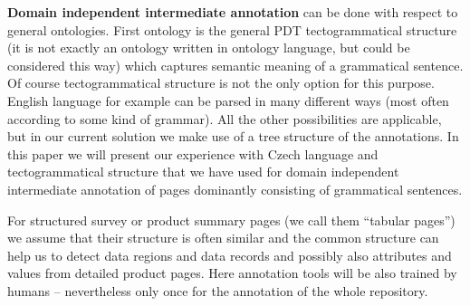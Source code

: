 \documentclass{www2009-submission}
\begin{document}
\textbf{Domain independent intermediate annotation} can be done with respect to general ontologies. First ontology is the general PDT tectogrammatical structure \cite{biblio:MiBeAnnotationtectogrammatical2006} (it is not exactly an ontology written in ontology language, but could be considered this way) which captures semantic meaning of a grammatical sentence. 
Of course tectogrammatical structure is not the only option for this purpose. English language for example can be parsed in many different ways (most often according to some kind of grammar). All the other possibilities are applicable, but in our current solution we make use of a tree structure of the annotations. In this paper we will present our experience with Czech language and tectogrammatical structure that we have used for domain independent intermediate annotation of pages dominantly consisting of grammatical sentences. 

For structured survey or product summary pages (we call them ``tabular pages'') we assume that their structure is often similar and the common structure can help us to detect data regions and data records and possibly also attributes and values from detailed product pages. Here annotation tools will be also trained by humans -- nevertheless only once for the annotation of the whole repository.




\end{document}
